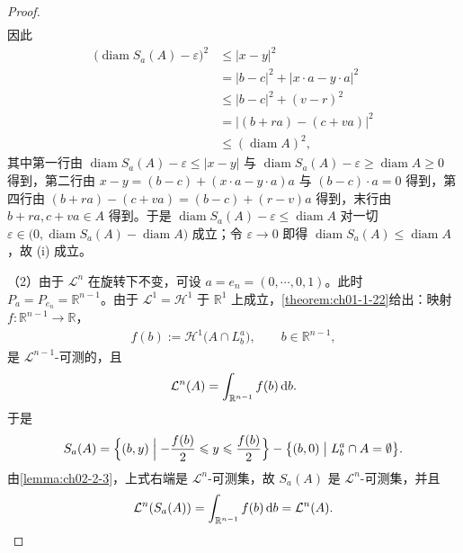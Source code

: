 \documentclass[../../main.tex]{subfiles}%
\begin{document}
\begin{proof}
\begin{align*}
\end{align*}
因此
\begin{align*}
\bigl(\operatorname{diam}S_a(A)-\varepsilon\bigr)^2
&\leqslant|x-y|^2\\
&=|b-c|^2+|x\cdot a-y\cdot a|^2\\
&\leqslant|b-c|^2+(v-r)^2\\
&=\bigl|(b+ra)-(c+va)\bigr|^2\\
&\leqslant(\operatorname{diam}A)^2,
\end{align*}
其中第一行由 $\operatorname{diam}S_a(A)-\varepsilon\leqslant|x-y|$ 与 $\operatorname{diam}S_a(A)-\varepsilon\geqslant\operatorname{diam}A\geqslant0$ 得到，第二行由 $x-y=(b-c)+(x\cdot a-y\cdot a)a$ 与 $(b-c)\cdot a=0$ 得到，第四行由 $(b+ra)-(c+va)=(b-c)+(r-v)a$ 得到，末行由 $b+ra,c+va\in A$ 得到。于是 $\operatorname{diam}S_a(A)-\varepsilon\leqslant\operatorname{diam}A$ 对一切 $\varepsilon\in\bigl(0,\operatorname{diam}S_a(A)-\operatorname{diam}A\bigr)$ 成立；令 $\varepsilon\to0$ 即得 $\operatorname{diam}S_a(A)\leqslant\operatorname{diam}A$，故 (i) 成立。

（2）由于 $\mathcal{L}^n$ 在旋转下不变，可设 $a=e_n=(0,\cdots,0,1)$。此时 $P_a=P_{e_n}=\mathbb{R}^{n-1}$。由于 $\mathcal{L}^1=\mathcal{H}^1$ 于 $\mathbb{R}^1$ 上成立，\cref{theorem:ch01-1-22}给出：映射 $f:\mathbb{R}^{n-1}\to\mathbb{R}$，%
\begin{align*}
f(b):=\mathcal{H}^1\bigl(A\cap L_b^a\bigr),\qquad b\in\mathbb{R}^{n-1},
\end{align*}
是 $\mathcal{L}^{n-1}$-可测的，且
\begin{align*}
\mathcal{L}^n(A)=\int_{\mathbb{R}^{n-1}}f(b)\,\mathrm{d} b .
\end{align*}
于是
\begin{align*}
S_a(A)=\Bigl\{(b,y)\Bigm|-\frac{f(b)}{2}\leqslant y\leqslant\frac{f(b)}{2}\Bigr\}-\bigl\{(b,0)\bigm| L_b^a\cap A=\emptyset\bigr\}.
\end{align*}
由\cref{lemma:ch02-2-3}，上式右端是 $\mathcal{L}^n$-可测集，故 $S_a(A)$ 是 $\mathcal{L}^n$-可测集，并且%
\begin{align*}
\mathcal{L}^n(S_a(A))=\int_{\mathbb{R}^{n-1}}f(b)\,\mathrm{d} b=\mathcal{L}^n(A).
\end{align*}


\end{proof}
\end{document}

